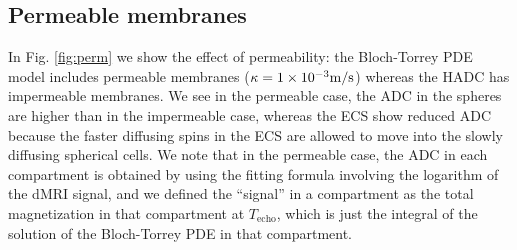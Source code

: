 \documentclass[a4paper]{article}
\begin{document}
\subsection{Permeable membranes}

In Fig. \ref{fig:perm} we show the effect of permeability: the Bloch-Torrey PDE model includes permeable membranes ($\kappa = 1\times 10^{-3}\mathrm{m/s}$) whereas the HADC has impermeable membranes. We see in the permeable case, the ADC in the spheres are higher than in the impermeable case, whereas the ECS show reduced ADC because the faster diffusing spins in the ECS are allowed to move into the slowly diffusing spherical cells. We note that in the permeable case, the ADC in each compartment is obtained by using the fitting formula involving the logarithm of the dMRI signal, and we defined the ``signal'' in a compartment as the total magnetization in that compartment at $T_\text{echo}$, which is just the integral of the solution of the Bloch-Torrey PDE in that compartment.
\end{document}
